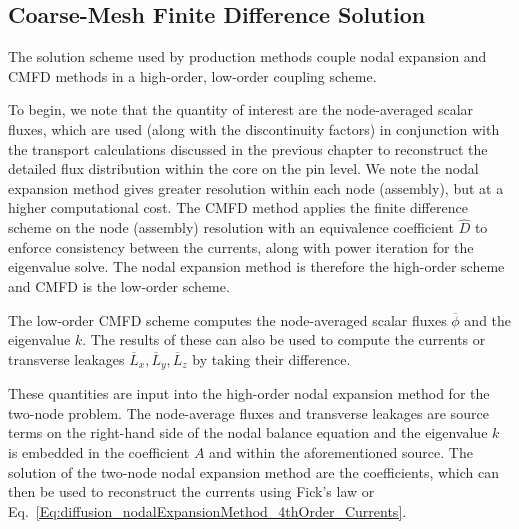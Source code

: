 \subsection{Coarse-Mesh Finite Difference Solution}

The solution scheme used by production methods couple nodal expansion and CMFD methods in a high-order, low-order coupling scheme. 

To begin, we note that the quantity of interest are the node-averaged scalar fluxes, which are used (along with the discontinuity factors) in conjunction with the transport calculations discussed in the previous chapter to reconstruct the detailed flux distribution within the core on the pin level. We note the nodal expansion method gives greater resolution within each node (assembly), but at a higher computational cost. The CMFD method applies the finite difference scheme on the node (assembly) resolution with an equivalence coefficient $\widehat{D}$ to enforce consistency between the currents, along with power iteration for the eigenvalue solve. The nodal expansion method is therefore the high-order scheme and CMFD is the low-order scheme.

The low-order CMFD scheme computes the node-averaged scalar fluxes $\overline{\phi}$ and the eigenvalue $k$. The results of these can also be used to compute the currents or transverse leakages $\overline{L}_x, \overline{L}_y, \overline{L}_z$ by taking their difference. 

These quantities are input into the high-order nodal expansion method for the two-node problem. The node-average fluxes and transverse leakages are source terms on the right-hand side of the nodal balance equation and the eigenvalue $k$ is embedded in the coefficient $A$ and within the aforementioned source. The solution of the two-node nodal expansion method are the coefficients, which can then be used to reconstruct the currents using Fick's law or Eq.~\eqref{Eq:diffusion_nodalExpansionMethod_4thOrder_Currents}. 


